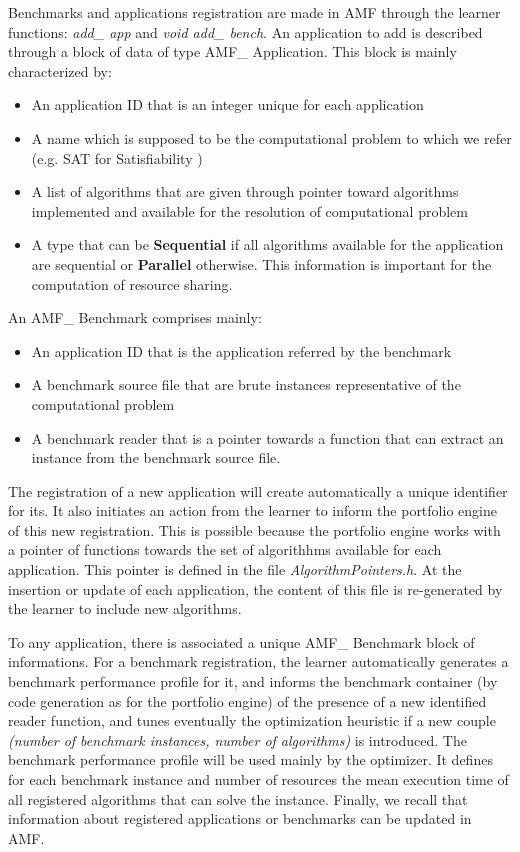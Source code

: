 Benchmarks and applications registration are made in AMF through the learner functions:
\textit{add\_ app} and \textit{void add\_ bench}. An application to add is described through a 
block of data of type AMF\_ Application. This block is mainly characterized by:
\begin{itemize}
\item An application ID that is an integer unique for each application
\item A name which is supposed to be the computational problem to which we refer (e.g. SAT for Satisfiability )
\item A list of algorithms that are given through pointer toward algorithms implemented and available for the resolution of 
 computational problem 
\item A type that can be \textbf{Sequential} if all algorithms available for the application are sequential 
or \textbf{Parallel} otherwise. This information is important for the computation of resource sharing.
\end{itemize}
An AMF\_ Benchmark comprises mainly:
\begin{itemize}
\item An application ID that is the application referred by the benchmark
\item A benchmark source file that are brute instances representative of the computational problem
\item A benchmark reader that is a pointer towards a function that can extract an instance from the benchmark 
source file.
\end{itemize} 
The registration of a new application will create automatically a unique 
identifier for its. It also initiates an action from the learner to inform the portfolio engine of this new 
registration. This is possible because the portfolio engine works with a pointer of functions towards the set of 
algorithhms available for each application. This pointer is defined in the file \textit{AlgorithmPointers.h}. 
At the insertion or update of each application, the content 
of this file is re-generated by the learner to include new algorithms. 

To any application, there is associated a unique AMF\_ Benchmark block of informations. 
For a benchmark registration, the learner automatically generates a benchmark performance profile for it,  
and informs the benchmark container (by code generation as for the portfolio engine) of the presence of a new 
identified reader function, and tunes eventually the optimization heuristic if a new couple \textit{(number of benchmark instances, number of algorithms)} is introduced. 
The benchmark performance profile will be used mainly by the optimizer. It defines for each benchmark 
instance and number of resources the mean execution time of all registered algorithms 
that can solve the instance. 
Finally, we recall that information about registered applications or benchmarks can be updated in AMF. 



